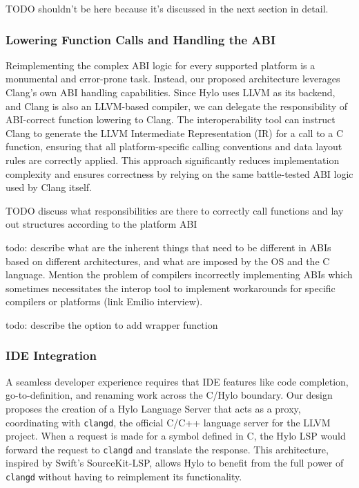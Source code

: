 TODO shouldn't be here because it's discussed in the next section in detail.

\subsubsection{Lowering Function Calls and Handling the ABI}

Reimplementing the complex ABI logic for every supported platform is a monumental and error-prone task. Instead, our proposed architecture leverages Clang's own ABI handling capabilities. Since Hylo uses LLVM as its backend, and Clang is also an LLVM-based compiler, we can delegate the responsibility of ABI-correct function lowering to Clang. The interoperability tool can instruct Clang to generate the LLVM Intermediate Representation (IR) for a call to a C function, ensuring that all platform-specific calling conventions and data layout rules are correctly applied. This approach significantly reduces implementation complexity and ensures correctness by relying on the same battle-tested ABI logic used by Clang itself.

TODO discuss what responsibilities are there to correctly call functions and lay out structures according to the platform ABI

todo: describe what are the inherent things that need to be different in ABIs based on different architectures, and what are imposed by the OS and the C language. Mention the problem of compilers incorrectly implementing ABIs which sometimes necessitates the interop tool to implement workarounds for specific compilers or platforms (link Emilio interview).

todo: describe the option to add wrapper function


\subsubsection{IDE Integration}

A seamless developer experience requires that IDE features like code completion, go-to-definition, and renaming work across the C/Hylo boundary. Our design proposes the creation of a Hylo Language Server that acts as a proxy, coordinating with \texttt{clangd}, the official C/C++ language server for the LLVM project. When a request is made for a symbol defined in C, the Hylo LSP would forward the request to \texttt{clangd} and translate the response. This architecture, inspired by Swift's SourceKit-LSP, allows Hylo to benefit from the full power of \texttt{clangd} without having to reimplement its functionality.

